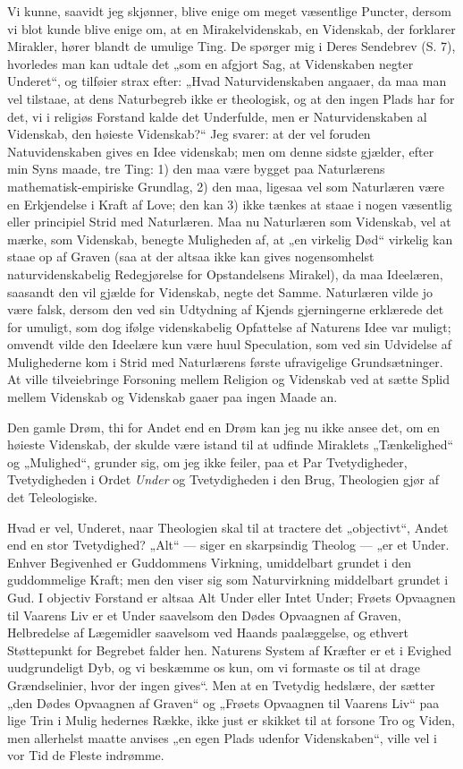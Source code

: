 \documentclass[12pt,a4paper]{article}
\newcommand{\opage}[1]{\marginnote{\footnotesize\textit{[#1]}}}
\begin{document}
Vi kunne, saavidt jeg skjønner, blive enige om meget
væsentlige Puncter, dersom vi blot kunde blive enige om,
at en Mirakelvidenskab, en Videnskab, der forklarer Mirakler,
hører blandt de umulige Ting. De spørger mig i Deres Sendebrev
(S. 7), hvorledes man kan udtale det „som en afgjort Sag,
at Videnskaben negter Underet“, og tilføier strax efter: „Hvad
Naturvidenskaben angaaer, da maa man vel tilstaae, at dens
Naturbegreb ikke er theologisk, og at den ingen Plads har
for det, vi i religiøs Forstand kalde det Underfulde, men er
Naturvidenskaben al Videnskab, den høieste Videnskab?“ Jeg
svarer: at der vel foruden Natuvidenskaben gives en Idee\-%
videnskab; men om denne sidste gjælder, efter min Syns\-%
maade, tre Ting: 1) den maa være bygget paa Naturlærens
mathematisk-empiriske Grundlag, 2) den maa, ligesaa vel som
Naturlæren være en Erkjendelse i Kraft af Love; den kan
3) ikke tænkes at staae i nogen væsentlig eller principiel Strid
med Naturlæren. Maa nu Naturlæren som Videnskab, vel at
mærke, som Videnskab, benegte Muligheden af, at „en virkelig
Død“ virkelig kan staae op af Graven (saa at der altsaa ikke
kan gives nogensomhelst naturvidenskabelig Redegjørelse for
Opstandelsens Mirakel), da maa Ideelæren, saasandt den vil
gjælde for Videnskab, negte det Samme. Naturlæren
vilde jo være falsk, dersom den ved sin Udtydning af Kjends\-%
gjerningerne erklærede det for umuligt, som dog ifølge
videnskabelig Opfattelse af Naturens Idee var muligt; omvendt
\opage{3}\setcounter{footnote}{0}%
vilde den Ideelære kun være huul Speculation, som ved sin
Udvidelse af Mulighederne kom i Strid med Naturlærens
første ufravigelige Grundsætninger. At ville tilveiebringe
Forsoning mellem Religion og Videnskab ved at sætte Splid
mellem Videnskab og Videnskab gaaer paa ingen Maade an.

Den gamle Drøm, thi for Andet end en Drøm kan jeg
nu ikke ansee det, om en høieste Videnskab, der skulde være
istand til at udfinde Miraklets „Tænkelighed“ og „Mulighed“,
grunder sig, om jeg ikke feiler, paa et Par Tvetydigheder,
Tvetydigheden i Ordet \emph{Under} og Tvetydigheden i den Brug,
Theologien gjør af det Teleologiske.

Hvad er vel, Underet, naar Theologien skal til at
tractere det „objectivt“, Andet end en stor Tvetydighed?
„Alt“ --- siger en skarpsindig Theolog --- „er et Under.
Enhver Begivenhed er Guddommens Virkning, umiddelbart
grundet i den guddommelige Kraft; men den viser sig som
Naturvirkning middelbart grundet i Gud. I objectiv Forstand
er altsaa Alt Under eller Intet Under; Frøets Opvaagnen
til Vaarens Liv er et Under saavelsom den Dødes Opvaagnen
af Graven, Helbredelse af Lægemidler saavelsom ved Haands\-%
paalæggelse, og ethvert Støttepunkt for Begrebet falder hen.
Naturens System af Kræfter er et i Evighed uudgrundeligt
Dyb, og vi beskæmme os kun, om vi formaste os til at drage
Grændselinier, hvor der ingen gives“. Men at en Tvetydig\-%
hedslære, der sætter „den Dødes Opvaagnen af Graven“ og
„Frøets Opvaagnen til Vaarens Liv“ paa lige Trin i Mulig\-%
hedernes Række, ikke just er skikket til at forsone Tro og
Viden, men allerhelst maatte anvises „en egen Plads udenfor
Videnskaben“, ville vel i vor Tid de Fleste indrømme.
\end{document}
